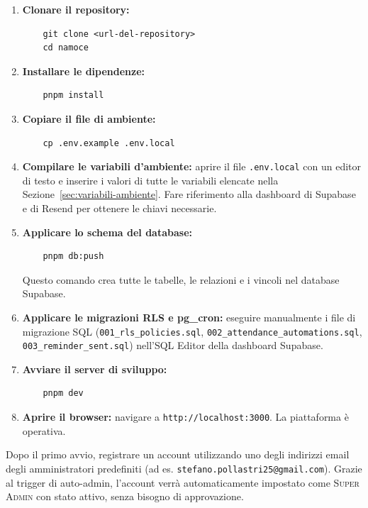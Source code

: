 \documentclass[a4paper,11pt,oneside]{book}
\newcommand{\percorso}[1]{\textcolor{namoCyan}{\texttt{#1}}}
\newcommand{\ruolo}[1]{\textsc{#1}}
\newcommand{\email}[1]{\texttt{#1}}
\begin{document}
\begin{enumerate}[leftmargin=1.5em]
  \item \textbf{Clonare il repository:}
    \begin{verbatim}
    git clone <url-del-repository>
    cd namoce
    \end{verbatim}

  \item \textbf{Installare le dipendenze:}
    \begin{verbatim}
    pnpm install
    \end{verbatim}

  \item \textbf{Copiare il file di ambiente:}
    \begin{verbatim}
    cp .env.example .env.local
    \end{verbatim}

  \item \textbf{Compilare le variabili d'ambiente:} aprire il file \texttt{.env.local} con un editor di testo e inserire i valori di tutte le variabili elencate nella Sezione~\ref{sec:variabili-ambiente}. Fare riferimento alla dashboard di Supabase e di Resend per ottenere le chiavi necessarie.

  \item \textbf{Applicare lo schema del database:}
    \begin{verbatim}
    pnpm db:push
    \end{verbatim}
    Questo comando crea tutte le tabelle, le relazioni e i vincoli nel database Supabase.

  \item \textbf{Applicare le migrazioni RLS e pg\_cron:} eseguire manualmente i file di migrazione SQL (\texttt{001\_rls\_policies.sql}, \texttt{002\_attendance\_automations.sql}, \texttt{003\_reminder\_sent.sql}) nell'SQL Editor della dashboard Supabase.

  \item \textbf{Avviare il server di sviluppo:}
    \begin{verbatim}
    pnpm dev
    \end{verbatim}

  \item \textbf{Aprire il browser:} navigare a \percorso{http://localhost:3000}. La piattaforma \`e operativa.
\end{enumerate}

\begin{tipbox}
Dopo il primo avvio, registrare un account utilizzando uno degli indirizzi email degli amministratori predefiniti (ad es. \email{stefano.pollastri25@gmail.com}). Grazie al trigger di auto-admin, l'account verr\`a automaticamente impostato come \ruolo{Super Admin} con stato attivo, senza bisogno di approvazione.
\end{tipbox}
\end{document}
